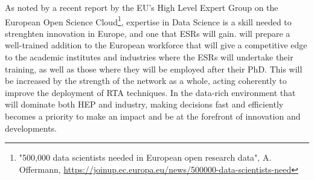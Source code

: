 As noted by a recent report by the EU's High Level
Expert Group on the European Open Science Cloud\footnote{"500,000 data scientists needed
in European open research data",
A. Offermann, \url{https://joinup.ec.europa.eu/news/500000-data-scientists-need}}, 
expertise in Data Science is a skill needed to strenghten innovation in Europe, 
and one that \acronym ESRs will gain. \acronym will prepare 
a well-trained addition to the European workforce that will give 
a competitive edge to the academic institutes and industries where the ESRs will
undertake their training, as well as those where they will be employed after their PhD.  
This will be increased by the strength of the network as a whole, 
acting coherently to improve the deployment of RTA 
techniques. In the data-rich environment that 
will dominate both HEP and industry, 
making decisions fast and efficiently becomes a priority to make an impact and
be at the forefront of innovation and developments.  



 
